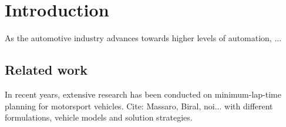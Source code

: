 \section{Introduction}
\label{sec:intro}

As the automotive industry advances towards higher levels of automation, ...

\subsection{Related work}
In recent years, extensive research has been conducted on minimum-lap-time planning for motorsport vehicles. Cite: Massaro, Biral, noi... with different formulations, vehicle models and solution strategies. 

%
%

